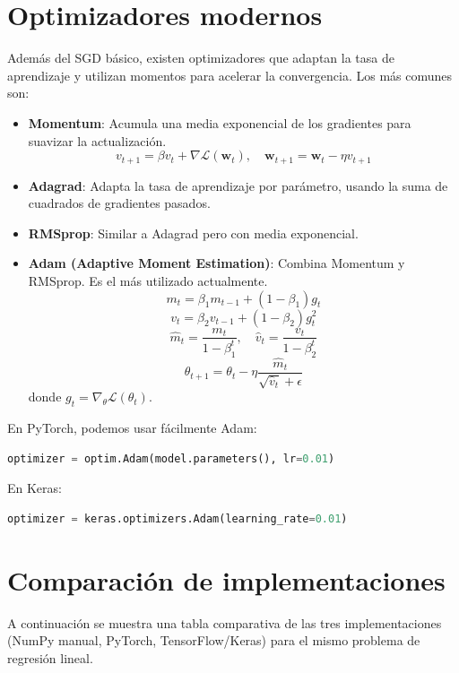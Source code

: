 \documentclass[12pt,a4paper,openany,oneside]{book}
\begin{document}
\section{Optimizadores modernos}

Además del SGD básico, existen optimizadores que adaptan la tasa de aprendizaje y utilizan momentos para acelerar la convergencia. Los más comunes son:

\begin{itemize}
    \item \textbf{Momentum}: Acumula una media exponencial de los gradientes para suavizar la actualización.
    \[
    v_{t+1} = \beta v_t + \nabla \mathcal{L}(\mathbf{w}_t), \quad \mathbf{w}_{t+1} = \mathbf{w}_t - \eta v_{t+1}
    \]
    \item \textbf{Adagrad}: Adapta la tasa de aprendizaje por parámetro, usando la suma de cuadrados de gradientes pasados.
    \item \textbf{RMSprop}: Similar a Adagrad pero con media exponencial.
    \item \textbf{Adam (Adaptive Moment Estimation)}: Combina Momentum y RMSprop. Es el más utilizado actualmente.
    \[
    m_t = \beta_1 m_{t-1} + (1-\beta_1) g_t
    \]
    \[
    v_t = \beta_2 v_{t-1} + (1-\beta_2) g_t^2
    \]
    \[
    \hat{m}_t = \frac{m_t}{1-\beta_1^t}, \quad \hat{v}_t = \frac{v_t}{1-\beta_2^t}
    \]
    \[
    \theta_{t+1} = \theta_t - \eta \frac{\hat{m}_t}{\sqrt{\hat{v}_t} + \epsilon}
    \]
    donde $g_t = \nabla_{\theta} \mathcal{L}(\theta_t)$.
\end{itemize}

En PyTorch, podemos usar fácilmente Adam:
\begin{lstlisting}[language=Python]
optimizer = optim.Adam(model.parameters(), lr=0.01)
\end{lstlisting}
En Keras:
\begin{lstlisting}[language=Python]
optimizer = keras.optimizers.Adam(learning_rate=0.01)
\end{lstlisting}

\section{Comparación de implementaciones}

A continuación se muestra una tabla comparativa de las tres implementaciones (NumPy manual, PyTorch, TensorFlow/Keras) para el mismo problema de regresión lineal.
\end{document}
